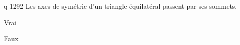 \begin{truefalse}{q-1292}
Les axes de symétrie d'un triangle équilatéral  passent par ses sommets.
\item* Vrai
\item Faux
\end{truefalse}

